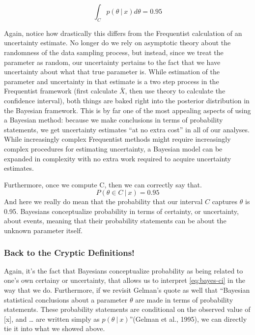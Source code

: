 \documentclass[12pt,twoside]{reedthesis}
\begin{document}
\[
\int_C p(\theta \ | \ x)d\theta = 0.95
\]

Again, notice how drastically this differs from the Frequentist calculation of an uncertainty estimate. No longer do we rely on asymptotic theory about the randomness of the data sampling process, but instead, since we treat the parameter as random, our uncertainty pertains to the fact that we have uncertainty about what that true parameter is. While estimation of the parameter and uncertainty in that estimate is a two step process in the Frequentist framework (first calculate \(\bar{X}\), then use theory to calculate the confidence interval), both things are baked right into the posterior distribution in the Bayesian framework. This is by far one of the most appealing aspects of using a Bayesian method: because we make conclusions in terms of probability statements, we get uncertainty estimates ``at no extra cost'' in all of our analyses. While increasingly complex Frequentist methods might require increasingly complex procedures for estimating uncertainty, a Bayesian model can be expanded in complexity with no extra work required to acquire uncertainty estimates.

Furthermore, once we compute C, then we can correctly say that.
\begin{equation}
  P(\theta \in C \ | \ x) = 0.95
  \label{eq:bayes-ci}
\end{equation}
And here we really do mean that the probability that our interval \(C\) captures \(\theta\) is 0.95. Bayesians conceptualize probability in terms of certainty, or uncertainty, about events, meaning that their probability statements can be about the unknown parameter itself.

\hypertarget{back-to-the-cryptic-definitions}{%
\subsubsection{Back to the Cryptic Definitions!}\label{back-to-the-cryptic-definitions}}

Again, it's the fact that Bayesians conceptualize probability as being related to one's own certainy or uncertainty, that allows us to interpret \eqref{eq:bayes-ci} in the way that we do. Furthermore, if we revisit Gelman's quote as well that ``Bayesian statistical conclusions about a parameter \(\theta\) are made in terms of probability statements. These probability statements are conditional on the observed value of {[}x{]}, and \ldots{} are written simply as \(p(\theta \ | \ x)\)''(Gelman et al., 1995), we can directly tie it into what we showed above.
\end{document}
